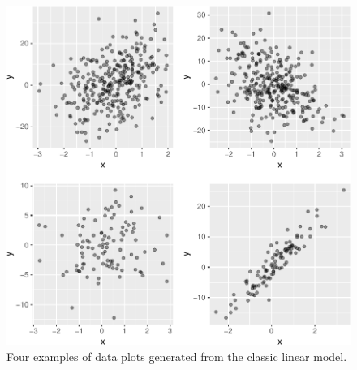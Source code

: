 \documentclass[12pt]{article}
\begin{document}
\begin{figure}
\centering
\includegraphics{pc_plots_files/figure-latex/linear-1.pdf}
\caption{Four examples of data plots generated from the classic linear
model.}
\end{figure}
\end{document}
